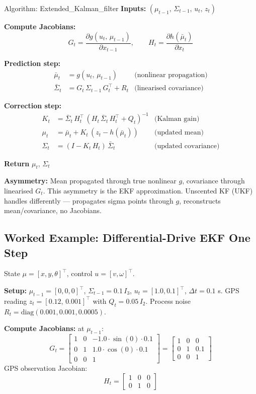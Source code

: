 \documentclass[11pt,a4paper]{article}
\begin{document}
\begin{algobox}{Algorithm: Extended\_Kalman\_filter}
\textbf{Inputs:} $(\mu_{t-1},\, \Sigma_{t-1},\, u_t,\, z_t)$



\textbf{Compute Jacobians:}
\[
G_t = \frac{\partial g(u_t,\, \mu_{t-1})}{\partial x_{t-1}}, \qquad H_t = \frac{\partial h(\bar{\mu}_t)}{\partial x_t}
\]

\textbf{Prediction step:}
\begin{align*}
\bar{\mu}_t &= g(u_t,\, \mu_{t-1}) & \text{(nonlinear propagation)} \\
\bar{\Sigma}_t &= G_t\, \Sigma_{t-1}\, G_t^\top + R_t & \text{(linearised covariance)}
\end{align*}

\textbf{Correction step:}
\begin{align*}
K_t &= \bar{\Sigma}_t\, H_t^\top\, (H_t\, \bar{\Sigma}_t\, H_t^\top + Q_t)^{-1} & \text{(Kalman gain)} \\
\mu_t &= \bar{\mu}_t + K_t\, (z_t - h(\bar{\mu}_t)) & \text{(updated mean)} \\
\Sigma_t &= (I - K_t\, H_t)\, \bar{\Sigma}_t & \text{(updated covariance)}
\end{align*}

\textbf{Return} $\mu_t,\, \Sigma_t$
\end{algobox}

\textbf{Asymmetry:} Mean propagated through true nonlinear $g$, covariance through linearised $G_t$. This asymmetry is the EKF approximation. Unscented KF (UKF) handles differently --- propagates sigma points through $g$, reconstructs mean/covariance, no Jacobians.

\subsection{Worked Example: Differential-Drive EKF One Step}

State $\mu = [x, y, \theta]^\top$, control $u = [v, \omega]^\top$.

\textbf{Setup:} $\mu_{t-1} = [0, 0, 0]^\top$, $\Sigma_{t-1} = 0.1\, I_3$, $u_t = [1.0, 0.1]^\top$, $\Delta t = 0.1$ s. GPS reading $z_t = [0.12,\, 0.001]^\top$ with $Q_t = 0.05\, I_2$. Process noise $R_t = \mathrm{diag}(0.001, 0.001, 0.0005)$.

\textbf{Compute Jacobians:} at $\mu_{t-1}$:
\[
G_t = \begin{bmatrix}1 & 0 & -1.0 \cdot \sin(0) \cdot 0.1 \\ 0 & 1 & 1.0 \cdot \cos(0) \cdot 0.1 \\ 0 & 0 & 1\end{bmatrix} = \begin{bmatrix}1 & 0 & 0 \\ 0 & 1 & 0.1 \\ 0 & 0 & 1\end{bmatrix}
\]
GPS observation Jacobian:
\[
H_t = \begin{bmatrix}1 & 0 & 0 \\ 0 & 1 & 0\end{bmatrix}
\]
\end{document}
